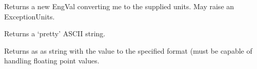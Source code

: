 \documentclass[letterpaper,10pt,english]{sphinxmanual}
\begin{document}
\begin{fulllineitems}
\begin{fulllineitems}
\end{fulllineitems}


\begin{fulllineitems}
\label{\detokenize{ref/LIS/core/EngVal:TotalDepth.LIS.core.EngVal.EngVal.newEngValInUnits}}
Returns a new EngVal converting me to the supplied units.
May raise an ExceptionUnits.

\end{fulllineitems}


\begin{fulllineitems}
\label{\detokenize{ref/LIS/core/EngVal:TotalDepth.LIS.core.EngVal.EngVal.pStr}}
Returns a ‘pretty’ ASCII string.

\end{fulllineitems}


\begin{fulllineitems}
\label{\detokenize{ref/LIS/core/EngVal:TotalDepth.LIS.core.EngVal.EngVal.strFormat}}
Returns as as string with the value to the specified format (must be
capable of handling floating point values.

\end{fulllineitems}


\end{fulllineitems}

\end{document}
